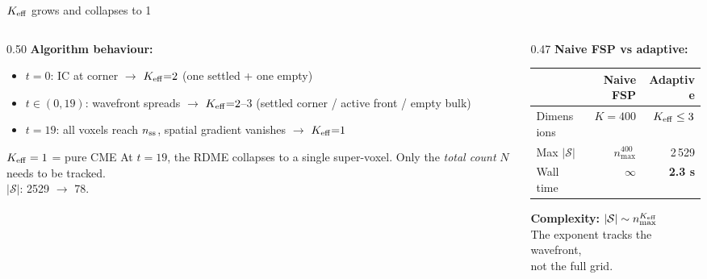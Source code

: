 \documentclass[10pt,aspectratio=169]{beamer}
\begin{document}
\begin{frame}{$K_{\rm eff}$ grows and collapses to 1}

\begin{columns}[T]
\begin{column}{0.50\textwidth}
  \textbf{Algorithm behaviour:}
  \begin{itemize}\setlength\itemsep{0.5em}
    \item $t{=}0$: IC at corner $\to$ $K_{\rm eff}{=}2$
          (one settled + one empty)
    \item $t\in(0,19)$: wavefront spreads $\to$ $K_{\rm eff}{=}2$--$3$
          (settled corner / active front / empty bulk)
    \item $t{=}19$: all voxels reach $n_{\rm ss}$, spatial gradient
          vanishes $\to$ $K_{\rm eff}{=}1$
  \end{itemize}

  \bigskip
  \begin{alertblock}{$K_{\rm eff} = 1$ = pure CME}
    At $t{=}19$, the RDME collapses to a single
    super-voxel.  Only the \emph{total count} $N$ needs
    to be tracked.\\[0.3em]
    $|\mathcal{S}|$: 2529 $\to$ 78.
  \end{alertblock}
\end{column}
\begin{column}{0.47\textwidth}
  \textbf{Naive FSP vs adaptive:}

  \bigskip
  \begin{tabular}{lrr}
    \toprule
    & Naive FSP & Adaptive \\
    \midrule
    Dimensions & $K = 400$ & $K_{\rm eff} \le 3$ \\
    Max $|\mathcal{S}|$ & $n_{\max}^{400}$ & 2\,529 \\
    Wall time & $\infty$ & \textbf{2.3 s} \\
    \bottomrule
  \end{tabular}

  \bigskip
  \textbf{Complexity:} $|\mathcal{S}| \sim n_{\max}^{K_{\rm eff}}$\\
  The exponent tracks the wavefront,\\
  not the full grid.
\end{column}
\end{columns}
\end{frame}
\end{document}

